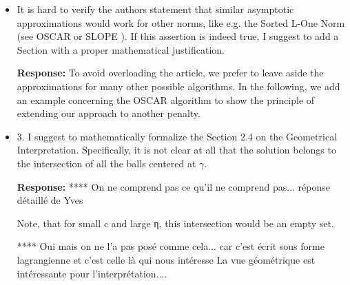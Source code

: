 \documentclass[a4paper,11pt]{texMemo}
\newenvironment{comment}
{
   \par\medskip \color{black}%
   \textbf{Response: }}
{\medskip}
\newenvironment{remark}
{\begin{itshape} \color{gray}}
{\end{itshape}}
\begin{document}
\begin{itemize}
   \begin{comment}
     We agree with the reviewer, as stated in the paper line 100
    \end{comment}

   
\item 
  \begin{remark}
    It is hard to verify the authors statement that similar asymptotic
    approximations would work for other norms, like e.g.  the Sorted
    L-One Norm (see OSCAR \citep{Bondell08} or SLOPE
    \citep{bogdan2015slope}).  If this assertion is indeed true, I
    suggest to add a Section with a proper mathematical justification.
\end{remark}
  

\begin{comment}
  To avoid overloading the article, we prefer to leave aside the
  approximations for many other possible algorithms. In the following,
  we add an example concerning the OSCAR algorithm to show the
  principle of extending our approach to another penalty.

  


\end{comment}


\item 
  \begin{remark}
    3. I suggest to mathematically formalize the Section 2.4 on the
    Geometrical Interpretation. Specifically, it is not clear at all
    that the solution belongs to the intersection of all the balls
    centered at $\gamma$.
  \end{remark}

\begin{comment}
  **** On ne comprend pas ce qu'il ne comprend pas... réponse détaillé
  de Yves

Note, that for small c and large η, this intersection would be an empty set.

**** Oui mais on ne l'a pas posé comme cela... car c'est écrit sous forme lagrangienne et c'est celle là qui nous intéresse
La vue géométrique est intéressante pour l'interprétation.... 

\end{comment}




\end{itemize}
\end{document}
